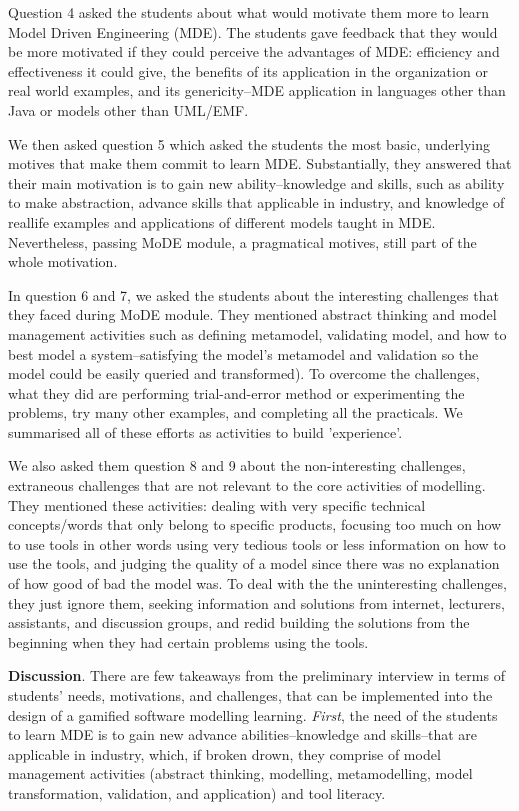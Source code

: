 \documentclass[12pt, a4paper]{report}
\begin{document}
Question 4 asked the students about what would motivate them more to learn Model Driven Engineering (MDE). The students gave feedback that they would be more motivated if they could perceive the advantages of MDE: efficiency and effectiveness it could give, the benefits of its application in the organization or real world examples, and its genericity--MDE application in languages other than Java or models other than UML/EMF.

We then asked question 5 which asked the students the most basic, underlying motives that make them commit to learn MDE. Substantially, they answered that their main motivation is to gain new ability--knowledge and skills, such as ability to make abstraction, advance skills that applicable in industry, and knowledge of reallife examples and applications of different models taught in MDE. Nevertheless, passing MoDE module, a pragmatical motives, still part of the whole motivation.  

In question 6 and 7, we asked the students about the interesting challenges that they faced during MoDE module. They mentioned abstract thinking and model management activities such as defining metamodel, validating model, and how to best model a system--satisfying the model's metamodel and validation so the model could be easily queried and transformed). To overcome the challenges, what they did are performing trial-and-error method or experimenting the problems, try many other examples, and completing all the practicals. We summarised all of these efforts as activities to build 'experience'.

We also asked them question 8 and 9 about the non-interesting challenges, extraneous challenges that are not relevant to the core activities of modelling.  They mentioned these activities: dealing with very specific technical concepts/words that only belong to specific products, focusing too much on how to use tools in other words using very tedious tools or less information on how to use the tools, and judging the quality of a model since there was no explanation of how good of bad the model was. To deal with the the uninteresting challenges, they just ignore them, seeking information and solutions from internet, lecturers, assistants, and discussion groups, and redid building the solutions from the beginning when they had certain problems using the tools.

\textbf{Discussion}. There are few takeaways from the preliminary interview in terms of students' needs, motivations, and challenges, that can be implemented into the design of a gamified software modelling learning. \textit{First}, the need of the students to learn MDE is to gain new advance abilities--knowledge and skills--that are applicable in industry, which, if broken drown, they comprise of model management activities (abstract thinking, modelling, metamodelling, model transformation, validation, and application) and tool literacy. 
\end{document}
